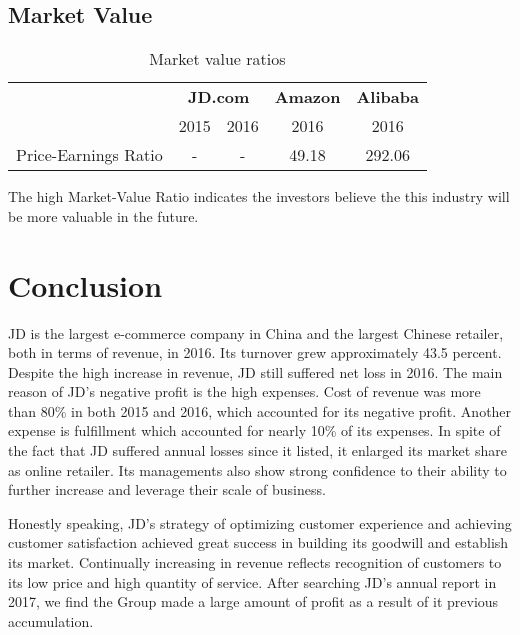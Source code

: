 \subsection{Market Value}


\begin{table}[H]	
	\begin{center}
		\begin{tabular}{p{5.6cm}cccc}
			\toprule 
			& \multicolumn{2}{c}{\textbf{JD.com}} & \multicolumn{1}{c}{\textbf{Amazon}}&\multicolumn{1}{c}{\textbf{Alibaba}}\\\cmidrule(lr){2-3} 
			\multirow{-2}{*}{} &\multicolumn{1}{c}{2015}&2016&\multicolumn{1}{c}{2016}&\multicolumn{1}{c}{2016}\\
			\midrule	
	     	Price-Earnings Ratio&-&-&	49.18&	292.06\\
			\bottomrule
		\end{tabular}
	\end{center}
	\caption{Market value ratios}\label{table:1}
\end{table}
The high Market-Value Ratio indicates the investors believe the this industry will be more valuable in the future.

\section{Conclusion}
JD is the largest e-commerce company in China and the largest Chinese retailer, both in terms of revenue, in 2016. Its turnover grew approximately 43.5 percent. Despite the high increase in revenue, JD still suffered net loss in 2016. The main reason of JD’s negative profit is the high expenses. Cost of revenue was more than 80\% in both 2015 and 2016, which accounted for its negative profit. Another expense is fulfillment which accounted for nearly 10\% of its expenses. In spite of the fact that JD suffered annual losses since it listed, it enlarged its market share as online retailer. Its managements also show strong confidence to their ability to further increase and leverage their scale of business.

Honestly speaking, JD’s strategy of optimizing customer experience and achieving customer satisfaction achieved great success in building its goodwill and establish its market. Continually increasing in revenue reflects recognition of customers to its low price and high quantity of service. After searching JD’s annual report in 2017, we find the Group made a large amount of profit as a result of it previous accumulation.

